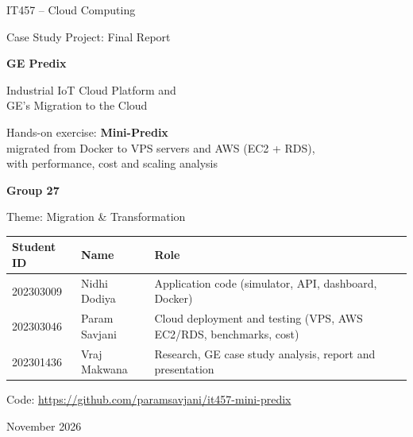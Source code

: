 \documentclass[12pt,a4paper]{article}
\begin{document}
\begin{titlepage}
\centering
\vspace*{1.5cm}
{\large IT457 -- Cloud Computing\par}
\vspace{0.3cm}
{\large Case Study Project: Final Report\par}
\vspace{1.8cm}
{\Huge\bfseries\color{head} GE Predix\par}
\vspace{0.4cm}
{\LARGE Industrial IoT Cloud Platform and\\[4pt] GE's Migration to the Cloud\par}
\vspace{1.2cm}
{\Large Hands-on exercise: \textbf{Mini-Predix}\\[4pt]
\large migrated from Docker to VPS servers and AWS (EC2 + RDS),\\ with performance, cost and scaling analysis\par}
\vspace{2cm}
{\large\bfseries Group 27\par}
\vspace{0.3cm}
{\large Theme: Migration \& Transformation\par}
\vspace{0.8cm}
{\small
\begin{tabular}{ll>{\raggedright\arraybackslash}p{6.6cm}}
\toprule
\textbf{Student ID} & \textbf{Name} & \textbf{Role} \\
\midrule
202303009 & Nidhi Dodiya & Application code (simulator, API, dashboard, Docker) \\
202303046 & Param Savjani & Cloud deployment and testing (VPS, AWS EC2/RDS, benchmarks, cost) \\
202301436 & Vraj Makwana & Research, GE case study analysis, report and presentation \\
\bottomrule
\end{tabular}}
\vfill
{\large Code: \url{https://github.com/paramsavjani/it457-mini-predix}\par}
\vspace{0.3cm}
{\large November 2026\par}
\end{titlepage}

\setcounter{tocdepth}{1}
\tableofcontents
\newpage

\end{document}
